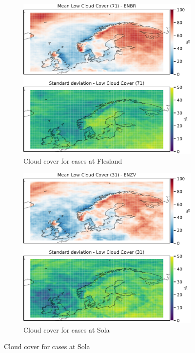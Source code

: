 \begin{figure}
     \centering
     \begin{subfigure}[b]{0.49\textwidth}
         \centering
         \includegraphics[width=\textwidth]{Figures/CCENBR.pdf}
         \caption{Cloud cover for cases at Flesland}
         \label{fig:ENBRCC}
     \end{subfigure}
     \hfill
     \begin{subfigure}[b]{0.49\textwidth}
         \centering
         \includegraphics[width=\textwidth]{Figures/CCENZV.pdf}
         \caption{Cloud cover for cases at Sola}
         \label{fig:ENZVCC}
     \end{subfigure}
     

\end{figure}
